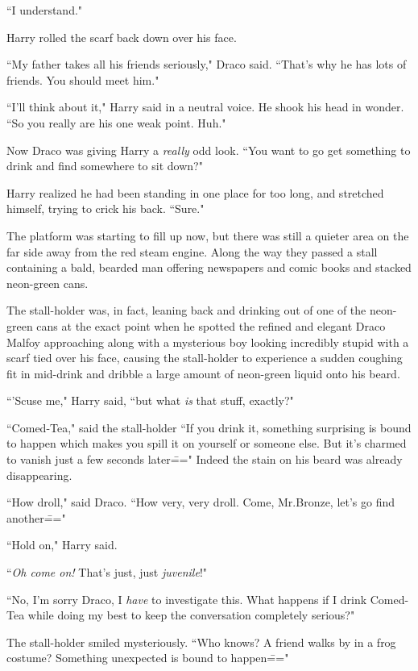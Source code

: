 ``I understand."

Harry rolled the scarf back down over his face.

``My father takes all his friends seriously," Draco said. ``That's why he has lots of friends. You should meet him."

``I'll think about it," Harry said in a neutral voice. He shook his head in wonder. ``So you really are his one weak point. Huh."

Now Draco was giving Harry a \emph{really} odd look. ``You want to go get something to drink and find somewhere to sit down?"

Harry realized he had been standing in one place for too long, and stretched himself, trying to crick his back. ``Sure."

The platform was starting to fill up now, but there was still a quieter area on the far side away from the red steam engine. Along the way they passed a stall containing a bald, bearded man offering newspapers and comic books and stacked neon-green cans.

The stall-holder was, in fact, leaning back and drinking out of one of the neon-green cans at the exact point when he spotted the refined and elegant Draco Malfoy approaching along with a mysterious boy looking incredibly stupid with a scarf tied over his face, causing the stall-holder to experience a sudden coughing fit in mid-drink and dribble a large amount of neon-green liquid onto his beard.

``'Scuse me," Harry said, ``but what \emph{is} that stuff, exactly?"

``Comed-Tea," said the stall-holder ``If you drink it, something surprising is bound to happen which makes you spill it on yourself or someone else. But it's charmed to vanish just a few seconds later\===" Indeed the stain on his beard was already disappearing.

``How droll," said Draco. ``How very, very droll. Come, Mr.\?Bronze, let's go find another\==="

``Hold on," Harry said.

``\emph{Oh come on!} That's just, just \emph{juvenile}!"

``No, I'm sorry Draco, I \emph{have} to investigate this. What happens if I drink Comed-Tea while doing my best to keep the conversation completely serious?"

The stall-holder smiled mysteriously. ``Who knows? A friend walks by in a frog costume? Something unexpected is bound to happen\==="

